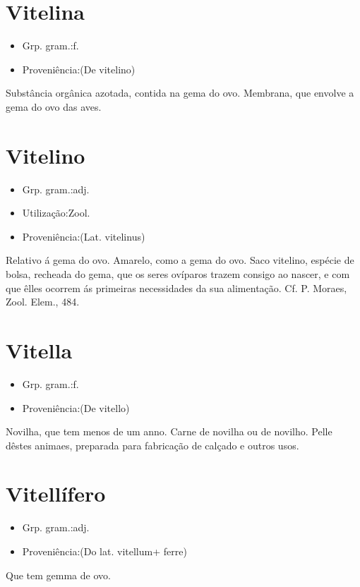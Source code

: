 \documentclass{article}
\begin{document}
\section{Vitelina}
\begin{itemize}
\item {Grp. gram.:f.}
\end{itemize}
\begin{itemize}
\item {Proveniência:(De \textunderscore vitelino\textunderscore )}
\end{itemize}
Substância orgânica azotada, contida na gema do ovo.
Membrana, que envolve a gema do ovo das aves.
\section{Vitelino}
\begin{itemize}
\item {Grp. gram.:adj.}
\end{itemize}
\begin{itemize}
\item {Utilização:Zool.}
\end{itemize}
\begin{itemize}
\item {Proveniência:(Lat. \textunderscore vitelinus\textunderscore )}
\end{itemize}
Relativo á gema do ovo.
Amarelo, como a gema do ovo.
\textunderscore Saco vitelino\textunderscore , espécie de bolsa, recheada do gema, que os seres ovíparos trazem consigo ao nascer, e com que êlles ocorrem ás primeiras necessidades da sua alimentação. Cf. P. Moraes, \textunderscore Zool. Elem.\textunderscore , 484.
\section{Vitella}
\begin{itemize}
\item {Grp. gram.:f.}
\end{itemize}
\begin{itemize}
\item {Proveniência:(De \textunderscore vitello\textunderscore )}
\end{itemize}
Novilha, que tem menos de um anno.
Carne de novilha ou de novilho.
Pelle dêstes animaes, preparada para fabricação de calçado e outros usos.
\section{Vitellífero}
\begin{itemize}
\item {Grp. gram.:adj.}
\end{itemize}
\begin{itemize}
\item {Proveniência:(Do lat. \textunderscore vitellum\textunderscore  + \textunderscore ferre\textunderscore )}
\end{itemize}
Que tem gemma de ovo.
\end{document}
